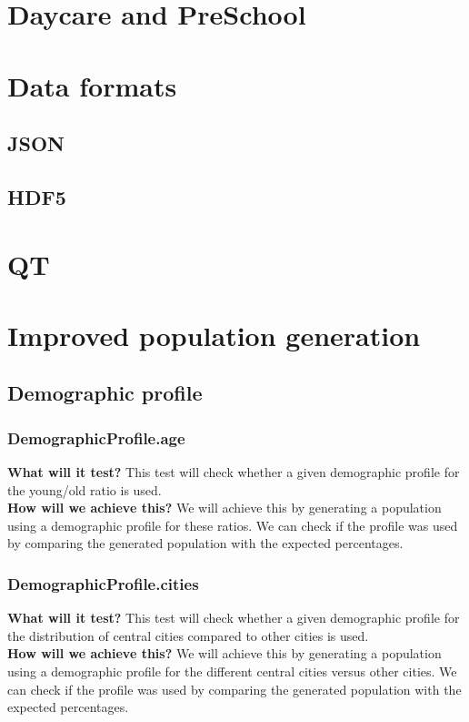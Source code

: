 \documentclass{article}
\begin{document}
\section{Daycare and PreSchool}
\section{Data formats}
\subsection{JSON}
\subsection{HDF5}
\section{QT}
\section{Improved population generation}
\subsection{Demographic profile}
\subsubsection{DemographicProfile.age} 
\textbf{What will it test?} 
This test will check whether a given demographic profile for the young/old ratio is used. \\
\newline
\textbf{How will we achieve this?} 
We will achieve this by generating a population using a demographic profile for these ratios. We can check if the profile was used by comparing the generated population with the expected percentages.

\subsubsection{DemographicProfile.cities}
\textbf{What will it test?} 
This test will check whether a given demographic profile for the distribution of central cities compared to other cities is used. \\
\newline
\textbf{How will we achieve this?}
We will achieve this by generating a population using a demographic profile for the different central cities versus other cities. We can check if the profile was used by comparing the generated population with the expected percentages.
\end{document}

